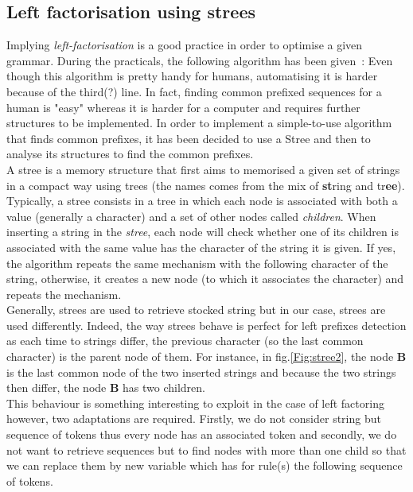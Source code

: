 \documentclass[a4paper,11pt]{article}
\begin{document}
  \subsection{Left factorisation using strees}
    Implying \textit{left-factorisation} is a good practice in order to optimise a given grammar. During the practicals, the following algorithm has been given~:
    Even though this algorithm is pretty handy for humans, automatising it is harder because of the third(?) line. In fact, finding common prefixed sequences for a human is "easy" whereas it is harder for a computer and requires further structures to be implemented. In order to implement a simple-to-use algorithm that finds common prefixes, it has been decided to use a Stree and then to analyse its structures to find the common prefixes.\\
    A stree is a memory structure that first aims to memorised a given set of strings in a compact way using trees (the names comes from the mix of \textbf{st}ring and tr\textbf{ee}). Typically, a stree consists in a tree in which each node is associated with both a value (generally a character) and a set of other nodes called \textit{children}. When inserting a string in the \textit{stree}, each node will check whether one of its children is associated with the same value has the character of the string it is given. If yes, the algorithm repeats the same mechanism with the following character of the string, otherwise, it creates a new node (to which it associates the character) and repeats the mechanism.\\
    Generally, strees are used to retrieve stocked string but in our case, strees are used differently. Indeed, the way strees behave is perfect for left prefixes detection as each time to strings differ, the previous character (so the last common character) is the parent node of them. For instance, in fig.\ref{Fig:stree2}, the node \textbf{B} is the last common node of the two inserted strings and because the two strings then differ, the node \textbf{B} has two children.\\
    This behaviour is something interesting to exploit in the case of left factoring however, two adaptations are required. Firstly, we do not consider string but sequence of tokens thus every node has an associated token and secondly, we do not want to retrieve sequences but to find nodes with more than one child so that we can replace them by new variable which has for rule(s) the following sequence of tokens.
    
\end{document}
